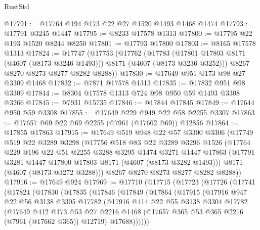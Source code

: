 \begin{lexlean}{RustStd}
\begin{coremodule}
@17791 := @17764 @194 @173 @22 @27 @1520 @1493 @1468 @1474
@17793 := @17791 @3245 @1447
@17795 := @8233 @17578 @1313
@17800 := @17795 @22 @193 @1520 @8244 @8250
@17801 := @17793 @17800
@17803 := @8165 @17578 @1313
@17824 := @17747
    (@17753
      (@17762
        (@17783 (@17801 @17803 @8171 (@4607 (@8173 @3246 @1493))) @8171 (@4607 (@8173 @3236 @3252)))
        @8267
        @8270
        @8273
        @8277
        @8282
        @8288))
@17830 := @17649 @951 @173 @98 @27 @3309 @1468
@17832 := @7871 @17578 @1313
@17835 := @17832 @951 @98 @3309
@17844 := @8304 @17578 @1313 @724 @98 @950 @59 @1493 @3308 @3266
@17845 := @7931 @15735
@17846 := @17844 @17845
@17849 := @17644 @950 @59 @3308
@17855 := @17649 @229 @949 @22 @58 @2255 @3307
@17863 := @17657 @69 @22 @69 @2255 (@7961 (@17662 @69)) @12856
@17864 := @17855 @17863
@17915 := @17649
    @519
    @948
    @22
    @57
    @3300
    @3306
    (@17749
      @519
      @22
      @3289
      @3298
      (@17756
        @518
        @83
        @22
        @3289
        @3296
        @1526
        (@17764
          @229
          @196
          @22
          @51
          @2255
          @3288
          @3295
          @1474
          @3271
          @1447
          @17863
          (@17791 @3281 @1447 @17800 @17803 @8171 (@4607 (@8173 @3282 @1493)))
          @8171
          (@4607 (@8173 @3272 @3288)))
        @8267
        @8270
        @8273
        @8277
        @8282
        @8288))
@17916 := @17649 @924
@17969 := @17710
    (@17715
      (@17723
        (@17726
          (@17741
            (@17824
              (@17830
                (@17835
                  (@17846
                    (@17849
                      (@17864
                        (@17915
                          (@17916
                            @947
                            @22
                            @56
                            @3138
                            @3305
                            @17782
                            (@17916
                              @414
                              @22
                              @55
                              @3138
                              @3304
                              @17782
                              (@17649
                                @412
                                @173
                                @53
                                @27
                                @2216
                                @1468
                                (@17657 @365 @53 @365 @2216 (@7961 (@17662 @365)) @12719)
                                @17688))))))

\end{coremodule}
\end{lexlean}
